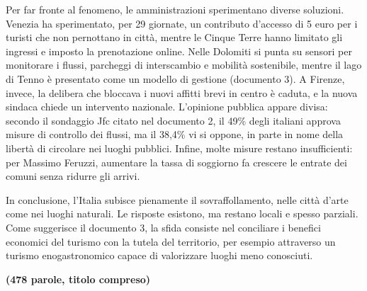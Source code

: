 \documentclass[11pt,a4paper]{article}
\begin{document}
Per far fronte al fenomeno, le amministrazioni sperimentano diverse soluzioni. Venezia ha sperimentato, per 29 giornate, un contributo d'accesso di 5 euro per i turisti che non pernottano in città, mentre le Cinque Terre hanno limitato gli ingressi e imposto la prenotazione online. Nelle Dolomiti si punta su sensori per monitorare i flussi, parcheggi di interscambio e mobilità sostenibile, mentre il lago di Tenno è presentato come un modello di gestione (documento 3). A Firenze, invece, la delibera che bloccava i nuovi affitti brevi in centro è caduta, e la nuova sindaca chiede un intervento nazionale. L'opinione pubblica appare divisa: secondo il sondaggio Jfc citato nel documento 2, il 49\% degli italiani approva misure di controllo dei flussi, ma il 38,4\% vi si oppone, in parte in nome della libertà di circolare nei luoghi pubblici. Infine, molte misure restano insufficienti: per Massimo Feruzzi, aumentare la tassa di soggiorno fa crescere le entrate dei comuni senza ridurre gli arrivi.

In conclusione, l'Italia subisce pienamente il sovraffollamento, nelle città d'arte come nei luoghi naturali. Le risposte esistono, ma restano locali e spesso parziali. Come suggerisce il documento 3, la sfida consiste nel conciliare i benefici economici del turismo con la tutela del territorio, per esempio attraverso un turismo enogastronomico capace di valorizzare luoghi meno conosciuti.

\textbf{(478 parole, titolo compreso)}
\end{document}

